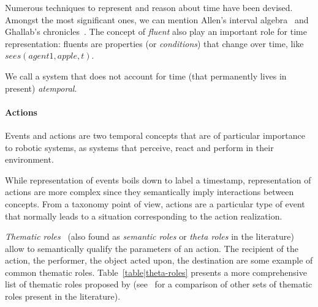 Numerous techniques to represent and reason about time have been devised.
Amongst the most significant ones, we can mention Allen's interval
algebra~\cite{Allen1984} and Ghallab's chronicles~\cite{Ghallab1996}.
The concept of \emph{fluent} also play an important role for time
representation: fluents are properties (or \emph{conditions}) that change over
time, like $sees(agent1, apple, t)$.

We call a system that does not account for time (\ie that permanently lives in
present) \emph{atemporal}.


\paragraph{Actions}

Events and actions are two temporal concepts that are of particular importance to
robotic systems, as systems that perceive, react and perform in their environment.

While representation of events boils down to label a timestamp,
representation of actions are more complex since they semantically imply
interactions between concepts. From a taxonomy point of view, actions are a
particular type of event that normally leads to a situation corresponding to the
action realization.


\emph{Thematic roles}~\cite{Gruber1965} (also found as \emph{semantic roles} or
\emph{theta roles} in the literature) allow to semantically qualify the
parameters of an action. The recipient of the action, the performer, the object
acted upon, the destination are some example of common thematic roles.
Table~\ref{table|theta-roles} presents a more comprehensive list of thematic
roles proposed by \cite{Aarts1997} (see~\cite{Gutierrez2001} for a comparison
of other sets of thematic roles present in the literature).

